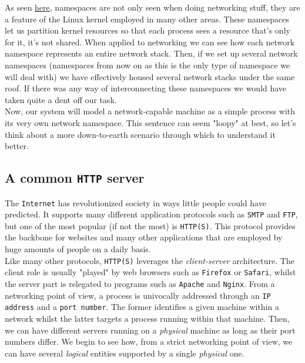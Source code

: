         As seen \href{https://en.wikipedia.org/wiki/Linux_namespaces}{here}, namespaces are not only seen when doing networking stuff, they are a feature of the Linux kernel employed in many other areas. These namespaces let us partition kernel resources so that each process sees a resource that's only for it, it's not shared. When applied to networking we can see how each network namespace represents an entire network stack. Then, if we set up several network namespaces (namespaces from now on as this is the only type of namespace we will deal with) we have effectively housed several network stacks under the same roof. If there was any way of interconnecting these namespaces we would have taken quite a dent off our task.\\

        Now, our system will model a network-capable machine as a simple process with its very own network namespace. This sentence can seem "loopy" at best, so let's think about a more down-to-earth scenario through which to understand it better.

        \subsection{A common \texttt{HTTP} server}
            The \texttt{Internet} has revolutionized society in ways little people could have predicted. It supports many different application protocols such as \texttt{SMTP} and \texttt{FTP}, but one of the most popular (if not the most) is \texttt{HTTP(S)}. This protocol provides the backbone for websites and many other applications that are employed by huge amounts of people on a daily basis.\\

            Like many other protocols, \texttt{HTTP(S)} leverages the \textit{client-server} architecture. The client role is usually "played" by web browsers such as \texttt{Firefox} or \texttt{Safari}, whilst the server part is relegated to programs such as \texttt{Apache} and \texttt{Nginx}. From a networking point of view, a process is univocally addressed through an \texttt{IP address} and a \texttt{port number}. The former identifies a given machine within a network whilst the latter targets a process running within that machine. Then, we can have different servers running on a \textit{physical} machine as long as their port numbers differ. We begin to see how, from a strict networking point of view, we can have several \textit{logical} entities supported by a single \textit{physical} one.\\

